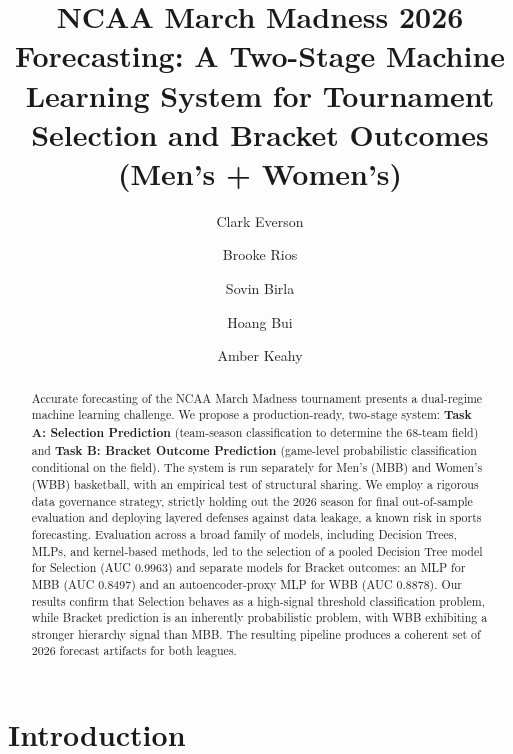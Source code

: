\documentclass[runningheads]{llncs}
\begin{document}
%
\title{NCAA March Madness 2026 Forecasting: A Two-Stage Machine Learning System for Tournament Selection and Bracket Outcomes (Men's + Women's)}
%
%
\author{
Clark Everson \and
Brooke Rios  \and
Sovin Birla  \and
Hoang Bui  \and
Amber Keahy 
}
%
%
\maketitle              %
%
\begin{abstract}
Accurate forecasting of the NCAA March Madness tournament presents a dual-regime machine learning challenge. We propose a production-ready, two-stage system: \textbf{Task A: Selection Prediction} (team-season classification to determine the 68-team field) and \textbf{Task B: Bracket Outcome Prediction} (game-level probabilistic classification conditional on the field). The system is run separately for Men’s (MBB) and Women’s (WBB) basketball, with an empirical test of structural sharing. We employ a rigorous data governance strategy, strictly holding out the 2026 season for final out-of-sample evaluation and deploying layered defenses against data leakage, a known risk in sports forecasting. Evaluation across a broad family of models, including Decision Trees, MLPs, and kernel-based methods, led to the selection of a pooled Decision Tree model for Selection (AUC 0.9963) and separate models for Bracket outcomes: an MLP for MBB (AUC 0.8497) and an autoencoder-proxy MLP for WBB (AUC 0.8878). Our results confirm that Selection behaves as a high-signal threshold classification problem, while Bracket prediction is an inherently probabilistic problem, with WBB exhibiting a stronger hierarchy signal than MBB. The resulting pipeline produces a coherent set of 2026 forecast artifacts for both leagues.\\
\end{abstract}

\section{Introduction}
\end{document}
